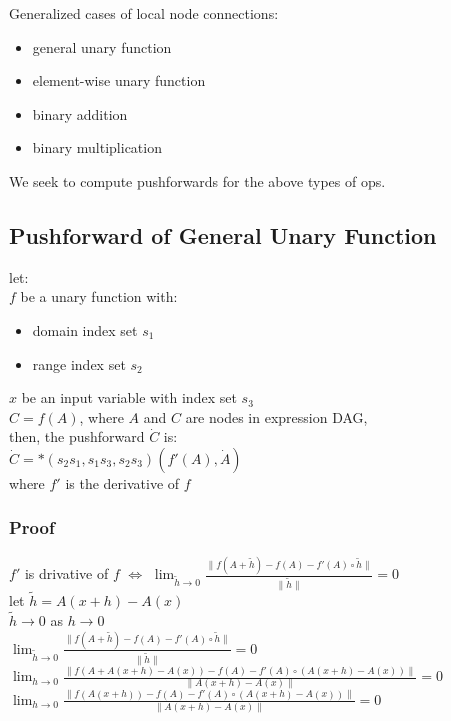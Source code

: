 \documentclass[8pt]{extarticle}
\begin{document}
\begin{multicols*}{2}
  Generalized cases of local node connections:
  \begin{itemize}
  \item general unary function
  \item element-wise unary function
  \item binary addition
  \item binary multiplication
  \end{itemize}

  We seek to compute pushforwards for the above types of ops.

  \vfill\null
  \columnbreak
    
  \subsection{Pushforward of General Unary Function}
  let:\\
  $f$ be a unary function with:
  \begin{itemize}
  \item domain index set $s_1$
  \item range index set $s_2$
  \end{itemize}
  $x$ be an input variable with index set $s_3$\\
  $C=f(A)$, where $A$  and $C$ are nodes in expression DAG,\\
  then, the pushforward $\dot{C}$ is:\\
  $\dot{C} = *(s_2 s_1, s_1 s_3, s_2 s_3)( f'(A), \dot{A})$\\
  where $f'$ is the derivative of $f$

  \subsubsection{Proof}
  $f'$ is drivative of $f$ $\iff$ $\lim_{\tilde{h} \rightarrow 0} \frac{\| f(A+\tilde{h}) - f(A) - f'(A) \circ \tilde{h} \|}{\| \tilde{h} \|} = 0$\\

  let $\tilde{h} = A(x+h) - A(x)$\\
  $\tilde{h} \rightarrow 0$ as $h \rightarrow 0$\\

  $\lim_{\tilde{h} \rightarrow 0} \frac{\| f(A+\tilde{h}) - f(A) - f'(A) \circ \tilde{h} \|}{\| \tilde{h} \|} = 0$\\
  $\lim_{h \rightarrow 0} \frac{\| f(A + A(x+h) - A(x)) - f(A) - f'(A) \circ (A(x+h) - A(x)) \|}{\| A(x+h) - A(x) \|} = 0$\\
  $\lim_{h \rightarrow 0} \frac{\| f(A(x+h)) - f(A) - f'(A) \circ (A(x+h) - A(x)) \|}{\| A(x+h) - A(x) \|} = 0$\\


\end{multicols*}
\end{document}
